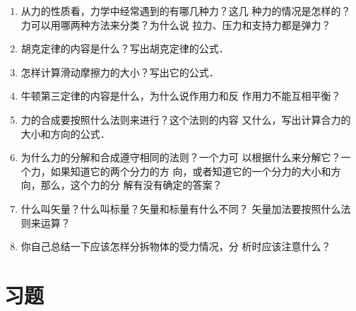 \begin{enumerate}
\item 从力的性质看，力学中经常遇到的有哪几种力？这几
种力的情况是怎样的？力可以用哪两种方法来分类？为什么说
拉力、压力和支持力都是弹力？
\item
胡克定律的内容是什么？写出胡克定律的公式．
\item
怎样计算滑动摩擦力的大小？写出它的公式．
\item 牛顿第三定律的内容是什么，为什么说作用力和反
作用力不能互相平衡？
\item
力的合成要按照什么法则来进行？这个法则的内容
又什么，写出计算合力的大小和方向的公式．
\item
为什么力的分解和合成遵守相同的法则？一个力可
以根据什么来分解它？一个力，如果知道它的两个分力的方
向，或者知道它的一个分力的大小和方向，那么，这个力的分
解有没有确定的答案？
\item
什么叫矢量？什么叫标量？矢量和标量有什么不同？
矢量加法要按照什么法则来运算？
\item
你自己总结一下应该怎样分拆物体的受力情况，分
析时应该注意什么？
\end{enumerate}

\section*{习题}

